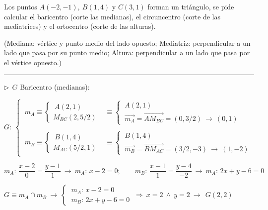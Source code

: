 \begin{miejercicio}

Los puntos $A(−2, −1), \ B(1, 4) \text{ y }  C(3, 1)$ forman un triángulo, se pide calcular el baricentro (corte las medianas), el circuncentro (corte de las mediatrices) y el ortocentro (corte de las alturas).

\vspace{2mm} \textcolor{gris}{(Mediana: vértice y punto medio del lado opuesto; Mediatriz: perpendicular a un lado que pasa por su punto medio; Altura: perpendicular a un lado que pasa por el vértice opuesto.)}

\rule{250pt}{0.1pt}

\vspace{2mm}$\triangleright \ \ G $ Baricentro (medianas):

\vspace{2mm} $G:\ \begin{cases} 
	\ m_A \equiv \begin{cases} \ A(2,1) \\ M_{BC}(2,5/2)  \end{cases} 
	&\equiv 
		\begin{cases} \ A(2,1) \\ \ \overrightarrow{m_A}=\overrightarrow{AM_{BC}}=(0,3/2) \ \to \ (0,1) \end{cases}
 	\\  \\ 
	\ m_B \equiv \begin{cases} \ B(1,4) \\ M_{AC}(5/2,1)  \end{cases} 
	&\equiv
		\begin{cases} \ B(1,4) \\ \ \overrightarrow{m_B}=\overrightarrow{BM_{AC}}=(3/2,-3) \ \to \ (1,-2) \end{cases}
\end{cases} $

\vspace{3mm} $m_A:\, \dfrac{x-2}{0}=\dfrac{y-1}{1} \ \to \ m_A:\,  x-2=0; \qquad m_B:\, \dfrac{x-1}{1}=\dfrac{y-4}{-2} \ \to \ m_A:\,  2x+y-6=0$

\vspace{2mm} $G\equiv m_A \cap m_B \ \to \ \begin{cases} \ m_A:\, x-2=0 \\ \ m_B:\, 2x+y-6=0 \end{cases} \ \Rightarrow \ x=2 \ \wedge \ y=2 \ \longrightarrow \ \ G(2,2)$


\end{miejercicio}
